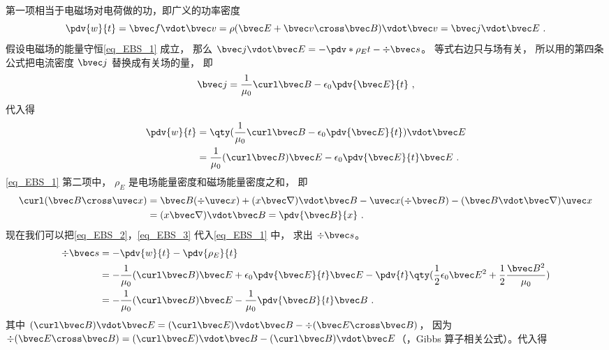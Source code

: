 第一项相当于电磁场对电荷做的功，即广义的功率密度
\begin{equation}
\pdv{w}{t} = \bvec f \vdot \bvec v = \rho (\bvec E + \bvec v \cross \bvec B) \vdot \bvec v = \bvec j \vdot \bvec E~.
\end{equation} 
假设电磁场的能量守恒\autoref{eq_EBS_1} 成立， 那么 $\bvec j \vdot \bvec E =  - \pdv*{\rho_E}{t} - \div \bvec s$。 等式右边只与场有关， 所以用的第四条公式把电流密度 $\bvec j$ 替换成有关场的量， 即
\begin{equation}
\bvec j = \frac{1}{\mu_0} \curl \bvec B - \epsilon_0 \pdv{\bvec E}{t}~,
\end{equation} 
代入得
\begin{equation}\label{eq_EBS_2}
\begin{aligned}
\pdv{w}{t} &= \qty(\frac{1}{\mu_0} \curl \bvec B - \epsilon_0 \pdv{\bvec E}{t}) \vdot \bvec E\\
&= \frac{1}{\mu_0} (\curl \bvec B)\bvec E - \epsilon_0 \pdv{\bvec E}{t} \bvec E~.
\end{aligned}
\end{equation} 
\autoref{eq_EBS_1} 第二项中， $\rho_E$ 是电场能量密度和磁场能量密度之和， 即
\begin{equation}\label{eq_EBS_3}
\begin{aligned}
\curl (\bvec B \cross \uvec x) &= \bvec B(\div \uvec x) + (x\bvec\nabla) \vdot\bvec B - \uvec x( \div \bvec B) - (\bvec B\vdot\bvec\nabla)\uvec x \\
&= (x\bvec\nabla)\vdot\bvec B = \pdv{\bvec B}{x}~.
\end{aligned}\end{equation} 
现在我们可以把\autoref{eq_EBS_2}，\autoref{eq_EBS_3} 代入\autoref{eq_EBS_1} 中， 求出 $\div \bvec s$。 
\begin{equation}
\begin{aligned}
\div \bvec s &=  - \pdv{w}{t} - \pdv{\rho_E}{t}\\
&= -\frac{1}{\mu_0} (\curl \bvec B)\bvec E + \epsilon_0 \pdv{\bvec E}{t} \bvec E - \pdv{t} \qty( \frac12 \epsilon_0 \bvec E^2 + \frac12 \frac{\bvec B^2}{\mu_0} )\\
&=  - \frac{1}{\mu_0} (\curl \bvec B)\bvec E - \frac{1}{\mu_0} \pdv{\bvec B}{t}\bvec B~.
\end{aligned}
\end{equation} 
其中 $(\curl \bvec B) \vdot \bvec E = (\curl \bvec E) \vdot \bvec B - \div (\bvec E \cross \bvec B)$， 因为 $\div (\bvec E \cross \bvec B) = (\curl \bvec E) \vdot \bvec B - (\curl \bvec B) \vdot \bvec E$（，Gibbs 算子相关公式）。代入得
